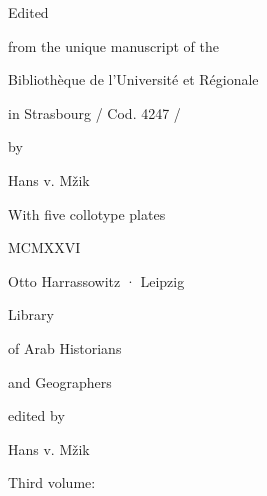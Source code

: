 \documentclass[11pt]{article}
\begin{document}
\begin{center}\large Edited\end{center}

\begin{center}\large from the unique manuscript of the\end{center}

\begin{center}\large Bibliothèque de l’Université et Régionale\end{center}

\begin{center}\large in Strasbourg / Cod. 4247 /\end{center}

\begin{center}\large by\end{center}

\begin{center}\large Hans v. Mžik\end{center}

\begin{center}\large With five collotype plates\end{center}

\begin{center}\large MCMXXVI\end{center}

\begin{center}\large Otto Harrassowitz · Leipzig\end{center}

\clearpage

\begin{center}\large Library\end{center}

\begin{center}\large of Arab Historians\end{center}

\begin{center}\large and Geographers\end{center}

\begin{center}\large edited by\end{center}

\begin{center}\large Hans v. Mžik\end{center}

\begin{center}\large Third volume:\end{center}
\end{document}
